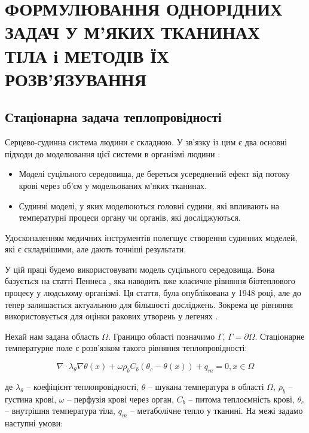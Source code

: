 \chapter{ФОРМУЛЮВАННЯ ОДНОРІДНИХ ЗАДАЧ У М'ЯКИХ ТКАНИНАХ ТІЛА і МЕТОДІВ ЇХ РОЗВ'ЯЗУВАННЯ}

\section{Стаціонарна задача теплопровідності}

Серцево-судинна система людини є складною. У зв'язку із цим є два основні підходи до моделювання цієї системи в 
організмі людини \cite{kutz-zhu-heat-transfer-biological-systems}:
\begin{itemize}
    \item Моделі суцільного середовища, де береться усереднений ефект від потоку крові через об'єм у модельованих м'яких
    тканинах. 
    \item Судинні моделі, у яких моделюються головні судини, які впливають на температурні процеси органу чи органів, 
    які досліджуються.
\end{itemize}
\noindent Удосконаленням медичних інструментів полегшує створення судинних моделей, які є складнішими, але дають точніші
результати. 

У цій праці будемо використовувати модель суцільного середовища. Вона базується на статті Пеннеса
\cite{thermal-process-tissue-pennes}, яка наводить вже класичне рівняння біотеплового процесу у людському організмі. Ця
стаття, була опублікована у 1948 році, але до тепер залишається актуальною для більшості досліджень. Зокрема це рівняння
використовується для оцінки ракових утворень у легенях \cite{lung-tumor-thermal-conductivity}.

Нехай нам задана область $\Omega$. Границю області позначимо $\Gamma$, $\Gamma = \partial \Omega$. Стаціонарне 
температурне поле є розв'язком такого рівняння теплопровідності:

\begin{equation}
    \label{eqn:theory_thermo_pennes_eqn}
    \nabla \cdot \lambda_\theta \nabla \theta(x) + \omega \rho_b C_b (\theta_c - \theta(x)) + q_m  = 0, x \in \Omega
\end{equation}

\noindent де $\lambda_\theta$ -- коефіцієнт теплопровідності, $\theta$ -- шукана температура в області $\Omega$, 
$\rho_b$ -- густина крові, $\omega$ -- перфузія крові через орган, $C_b$ -- питома теплоємність крові, 
$\theta_c$ -- внутрішня температура тіла, $q_m$ -- метаболічне тепло у тканині. На межі задамо наступні умови:

